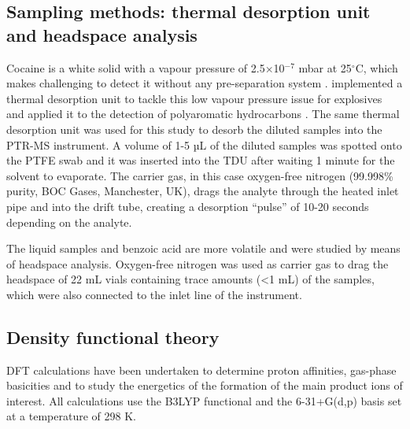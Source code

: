 \subsection{Sampling methods: thermal desorption unit and headspace analysis}
Cocaine is a white solid with a vapour pressure of 2.5$\times$10$^{-7}$ mbar  at 25$^\circ$C, which makes challenging to detect it without any pre-separation system \cite{cocaineVP55}.
%
%
%
\citeauthor{RN445} implemented a thermal desorption unit to tackle this low vapour pressure issue for explosives and \citeauthor{blenkhorn2019novel} applied it to the detection of polyaromatic hydrocarbons \cite{RN445,blenkhorn2019novel}.
The same thermal desorption unit was used for this study to desorb the diluted samples into the PTR-MS instrument.
%
A volume of 1-5 µL of the diluted samples was spotted onto the PTFE swab and it was inserted into the TDU after waiting 1 minute for the solvent to evaporate. The carrier gas, in this case oxygen-free nitrogen (99.998\% purity, BOC Gases, Manchester, UK), drags the analyte through the heated inlet pipe and into the drift tube, creating a desorption “pulse” of 10-20 seconds depending on the analyte.

The liquid samples and benzoic acid are more volatile and were studied by means of headspace analysis. Oxygen-free nitrogen was used as carrier gas to drag the headspace of 22 mL vials containing trace amounts (<1 mL) of the samples, which were also connected to the inlet line of the instrument. 

\subsection{Density functional theory}
DFT calculations have been undertaken to determine  proton affinities,  gas-phase basicities  and to study the energetics of the formation of the main product ions of interest. All calculations use the B3LYP functional and the 6-31+G(d,p) basis set at a temperature of 298 K.


